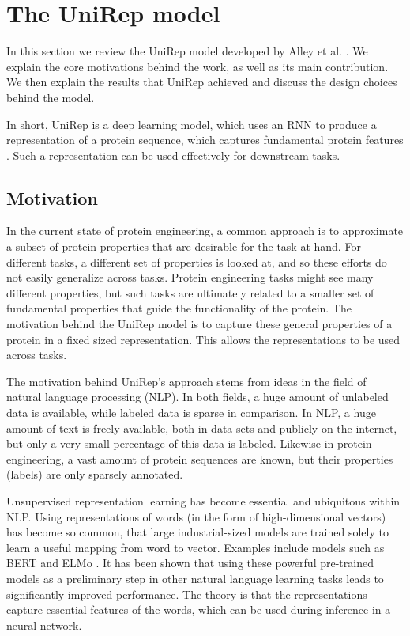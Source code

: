 \documentclass[a4paper,12pt]{article}
\begin{document}
\clearpage
\section{The UniRep model}
In this section we review the UniRep model developed by Alley et al. \cite{alley2019unified}. We explain the core motivations behind the work, as well as its main contribution. We then explain the results that UniRep achieved and discuss the design choices behind the model.

In short, UniRep is a deep learning model, which uses an RNN to produce a representation of a protein sequence, which captures fundamental protein features \cite{alley2019unified}. Such a representation can be used effectively for downstream tasks.

\subsection{Motivation}
In the current state of protein engineering, a common approach is to approximate a subset of protein properties that are desirable for the task at hand. For different tasks, a different set of properties is looked at, and so these efforts do not easily generalize across tasks. Protein engineering tasks might see many different properties, but such tasks are ultimately related to a smaller set of fundamental properties that guide the functionality of the protein. The motivation behind the UniRep model is to capture these general properties of a protein in a fixed sized representation. This allows the representations to be used across tasks.

The motivation behind UniRep's approach stems from ideas in the field of natural language processing (NLP). In both fields, a huge amount of unlabeled data is available, while labeled data is sparse in comparison. In NLP, a huge amount of text is freely available, both in data sets and publicly on the internet, but only a very small percentage of this data is labeled. Likewise in protein engineering, a vast amount of protein sequences are known, but their properties (labels) are only sparsely annotated.

Unsupervised representation learning has become essential and ubiquitous within NLP. Using representations of words (in the form of high-dimensional vectors) has become so common, that large industrial-sized models are trained solely to learn a useful mapping from word to vector. Examples include models such as BERT \cite{devlin2018bert} and ELMo \cite{peters2018deep}. It has been shown that using these powerful pre-trained models as a preliminary step in other natural language learning tasks leads to significantly improved performance. The theory is that the representations capture essential features of the words, which can be used during inference in a neural network.
\end{document}
